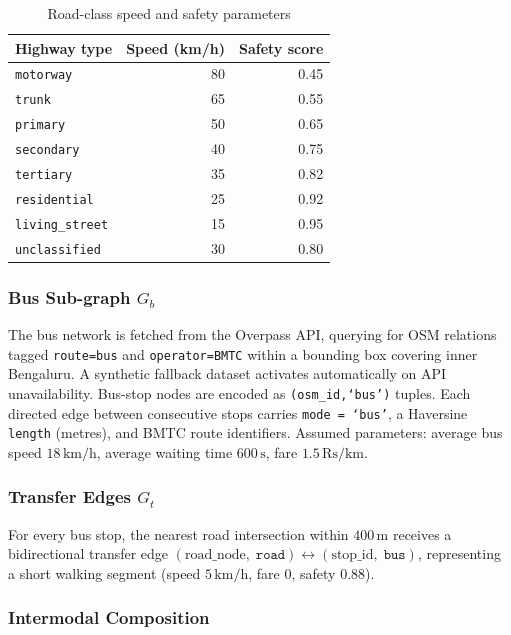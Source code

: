 \documentclass[12pt,a4paper]{article}
\begin{document}
\begin{table}[H]
\centering
\caption{Road-class speed and safety parameters}
\label{tab:road-params}
\begin{tabular}{lrr}
\toprule
\textbf{Highway type} & \textbf{Speed (km/h)} & \textbf{Safety score} \\
\midrule
\texttt{motorway}       & 80 & 0.45 \\
\texttt{trunk}          & 65 & 0.55 \\
\texttt{primary}        & 50 & 0.65 \\
\texttt{secondary}      & 40 & 0.75 \\
\texttt{tertiary}       & 35 & 0.82 \\
\texttt{residential}    & 25 & 0.92 \\
\texttt{living\_street} & 15 & 0.95 \\
\texttt{unclassified}   & 30 & 0.80 \\
\bottomrule
\end{tabular}
\end{table}

\subsubsection{Bus Sub-graph $G_b$}

The bus network is fetched from the Overpass API, querying for OSM
relations tagged \texttt{route=bus} and \texttt{operator=BMTC} within a
bounding box covering inner Bengaluru.  A synthetic fallback dataset
activates automatically on API unavailability.  Bus-stop nodes are encoded
as \texttt{(osm\_id,\;`bus')} tuples.  Each directed edge between consecutive
stops carries \texttt{mode = `bus'}, a Haversine \texttt{length} (metres),
and BMTC route identifiers.  Assumed parameters: average bus speed
$18\,\mathrm{km/h}$, average waiting time $600\,\mathrm{s}$, fare
$1.5\,\mathrm{Rs/km}$.

\subsubsection{Transfer Edges $G_t$}

For every bus stop, the nearest road intersection within $400\,\mathrm{m}$
receives a bidirectional transfer edge
$(\text{road\_node},\;\texttt{road}) \leftrightarrow (\text{stop\_id},\;\texttt{bus})$,
representing a short walking segment (speed $5\,\mathrm{km/h}$, fare $0$,
safety $0.88$).

\subsubsection{Intermodal Composition}
\end{document}
